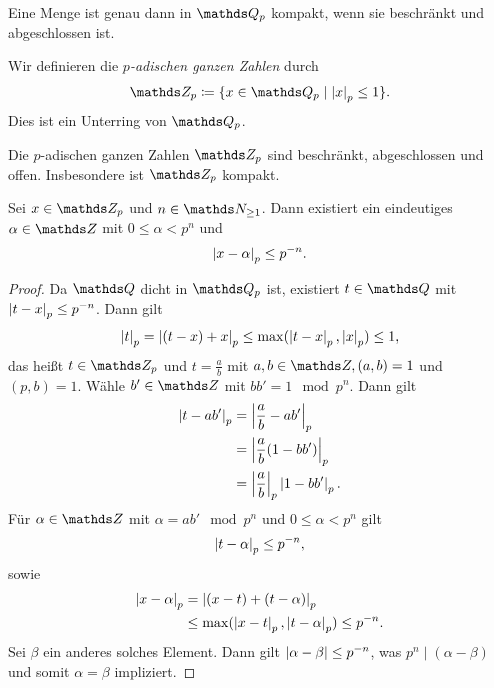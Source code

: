 \begin{cor}
Eine Menge ist genau dann in $\Q_p$ kompakt, wenn sie beschränkt und abgeschlossen ist.
\end{cor}

\begin{defi}
Wir definieren die \emph{$p$-adischen ganzen Zahlen} durch
\begin{align*}
\Z_p\coloneqq \{x\in \Q_p \mid \abs{x}_p \leq 1\}.
\end{align*}
Dies ist ein Unterring von $\Q_p$.
\end{defi}

\begin{satz}
Die $p$-adischen ganzen Zahlen $\Z_p$ sind beschränkt, abgeschlossen und offen.
Insbesondere ist $\Z_p$ kompakt.
\end{satz}

\begin{satz}
Sei $x\in \Z_p$ und $n\in \N_{\geq 1}$.
Dann existiert ein eindeutiges $\alpha \in \Z$ mit $0\leq \alpha <p^n$ und
\begin{align*}
\left\vert x-\alpha\right\vert_p\leq p^{-n}.
\end{align*}
\begin{proof}
Da $\Q$ dicht in $\Q_p$ ist, existiert $t \in \Q$ mit $\left\vert t-x\right\vert_p \leq p^{-n}$.
Dann gilt
\begin{align*}
\left\vert t\right\vert_p=\left\vert(t-x)+x\right\vert_p \leq \max(\left\vert t-x\right\vert_p,\left\vert x\right\vert_p) \leq 1,
\end{align*}
das heißt $t \in \Z_p$ und $t=\frac{a}{b}$ mit $a,b\in \Z, (a,b)=1$ und $(p,b)=1$.
Wähle $b'\in \Z$ mit $bb'=1 \mod p^n$.
Dann gilt
\begin{align*}
\left\vert t-ab'\right\vert_p&=\left\vert\frac{a}{b}-ab'\right\vert_p\\
&=\left\vert\frac{a}{b}(1-bb')\right\vert_p\\
&=\left\vert\frac{a}{b}\right\vert_p \left\vert1-bb'\right\vert_p.
\end{align*}
Für $\alpha \in \Z$ mit $\alpha=ab' \mod p^n$ und $0 \leq \alpha <p^n$ gilt
\begin{align*}
\left\vert t-\alpha\right\vert_p\leq p^{-n},
\end{align*}
sowie
\begin{align*}
\left\vert x-\alpha\right\vert_p &=\left\vert(x-t)+(t-\alpha)\right\vert_p\\
&\leq \max (\left\vert x-t\right\vert_p,\left\vert t-\alpha\right\vert_p)\leq p^{-n}.
\end{align*}
Sei $\beta$ ein anderes solches Element. Dann gilt $\left\vert\alpha-\beta\right\vert\leq p^{-n}$, was $p^n\mid (\alpha-\beta)$ und somit $\alpha=\beta$ impliziert.
\end{proof}
\end{satz}

